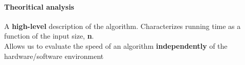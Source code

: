 \documentclass{article}
\begin{document}
\begin{minipage}{0.45\textwidth}
\paragraph{Theoritical analysis}
\begin{flushleft}
A \textbf{high-level} description of the algorithm. Characterizes running time as a function of the input size, \textbf{n}.\\
Allows us to evaluate the speed of an algorithm \textbf{independently} of the hardware/software environment
\end{flushleft}
\end{minipage}
\begin{minipage}{0.45\textwidth}
\end{minipage}
\end{document}
